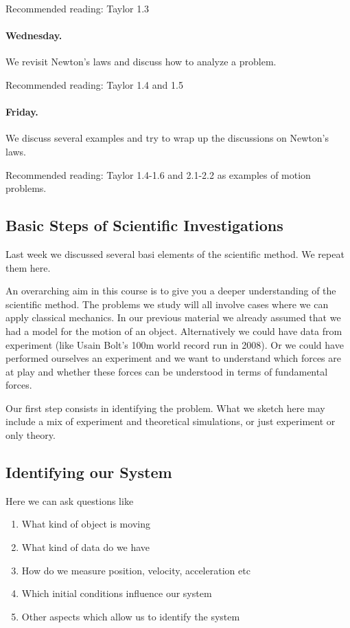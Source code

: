 \documentclass[%
oneside,                 %
final,                   %
10pt]{article}
\begin{document}
Recommended reading: Taylor 1.3

\paragraph{Wednesday.}
We revisit Newton's laws and discuss how to analyze a problem.

Recommended reading: Taylor 1.4 and 1.5

\paragraph{Friday.}
We discuss several examples and try to wrap up the discussions on Newton's laws.

Recommended reading: Taylor 1.4-1.6 and 2.1-2.2 as examples of motion problems.

\subsection{Basic Steps of Scientific Investigations}

Last week we discussed several basi elements of the scientific method. We repeat them here.

An overarching aim in this course is to give you a deeper
understanding of the scientific method. The problems we study will all
involve cases where we can apply classical mechanics. In our previous
material we already assumed that we had a model for the motion of an
object.  Alternatively we could have data from experiment (like Usain
Bolt's 100m world record run in 2008).  Or we could have performed
ourselves an experiment and we want to understand which forces are at
play and whether these forces can be understood in terms of
fundamental forces.

Our first step consists in identifying the problem. What we sketch
here may include a mix of experiment and theoretical simulations, or
just experiment or only theory.

\subsection{Identifying our System}

Here we can ask questions like
\begin{enumerate}
\item What kind of object is moving

\item What kind of data do we have

\item How do we measure position, velocity, acceleration etc

\item Which initial conditions influence our system

\item Other aspects which allow us to identify the system
\end{enumerate}
\end{document}
